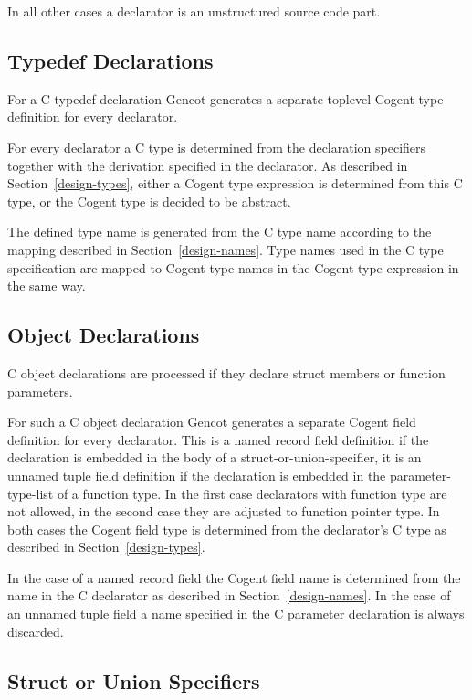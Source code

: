 In all other cases a declarator is an unstructured
source code part.

\subsection{Typedef Declarations}
\label{design-decls-typedefs}

For a C typedef declaration Gencot generates a separate toplevel Cogent type definition for every declarator.

For every declarator a C type is determined from the declaration specifiers together with the derivation specified
in the declarator. As described in Section~\ref{design-types}, either a Cogent type expression is determined from this C type,
or the Cogent type is decided to be abstract. 

The defined type name is generated from the C type name according to the mapping described in Section~\ref{design-names}.
Type names used in the C type specification are mapped to Cogent type names in the Cogent type expression in the same way.

\subsection{Object Declarations}

C object declarations are processed if they declare struct members or function parameters.

For such a C object declaration Gencot generates a separate Cogent field 
definition for every declarator. This is a named record field definition if the declaration is embedded in the
body of a struct-or-union-specifier, it is an unnamed tuple field definition if the declaration is embedded in the
parameter-type-list of a function type. In the first case declarators with function type are not allowed, in the
second case they are adjusted to function pointer type. In both cases the Cogent field type is determined from the 
declarator's C type as described in Section~\ref{design-types}. 

In the case of a named record field the Cogent
field name is determined from the name in the C declarator as described in Section~\ref{design-names}. In the 
case of an unnamed tuple field a name specified in the C parameter declaration is always discarded.

\subsection{Struct or Union Specifiers}

